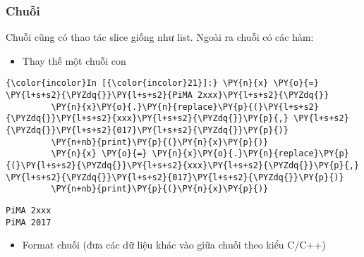     \subsubsection{Chuỗi}\label{chuux1ed7i}

    Chuỗi cũng có thao tác slice giống như list. Ngoài ra chuỗi có các hàm:

    \begin{itemize}
\tightlist
\item
  Thay thế một chuỗi con
\end{itemize}

    
\begin{Verbatim}[commandchars=\\\{\}]
{\color{incolor}In [{\color{incolor}21}]:} \PY{n}{x} \PY{o}{=} \PY{l+s+s2}{\PYZdq{}}\PY{l+s+s2}{PiMA 2xxx}\PY{l+s+s2}{\PYZdq{}}
         \PY{n}{x}\PY{o}{.}\PY{n}{replace}\PY{p}{(}\PY{l+s+s2}{\PYZdq{}}\PY{l+s+s2}{xxx}\PY{l+s+s2}{\PYZdq{}}\PY{p}{,} \PY{l+s+s2}{\PYZdq{}}\PY{l+s+s2}{017}\PY{l+s+s2}{\PYZdq{}}\PY{p}{)}
         \PY{n+nb}{print}\PY{p}{(}\PY{n}{x}\PY{p}{)}
         \PY{n}{x} \PY{o}{=} \PY{n}{x}\PY{o}{.}\PY{n}{replace}\PY{p}{(}\PY{l+s+s2}{\PYZdq{}}\PY{l+s+s2}{xxx}\PY{l+s+s2}{\PYZdq{}}\PY{p}{,} \PY{l+s+s2}{\PYZdq{}}\PY{l+s+s2}{017}\PY{l+s+s2}{\PYZdq{}}\PY{p}{)}
         \PY{n+nb}{print}\PY{p}{(}\PY{n}{x}\PY{p}{)}
\end{Verbatim}
    

    \begin{Verbatim}[commandchars=\\\{\}]
PiMA 2xxx
PiMA 2017

    \end{Verbatim}

    \begin{itemize}
\tightlist
\item
  Format chuỗi (đưa các dữ liệu khác vào giữa chuỗi theo kiểu C/C++)
\end{itemize}

